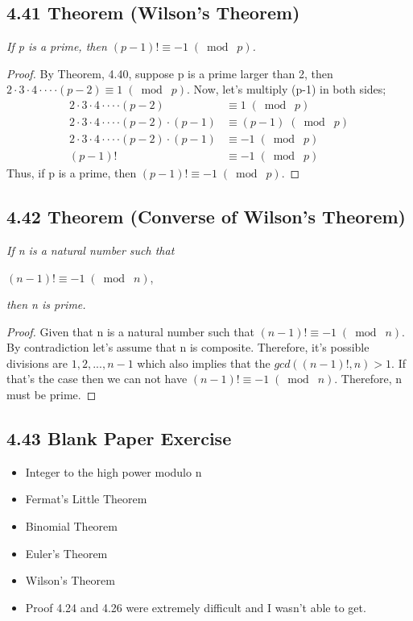 \documentclass{article}
\begin{document}
\subsection*{4.41 Theorem (Wilson's Theorem)} 
\quad \textit{If p is a prime, then $(p-1)! \equiv -1 \;(\bmod\; p)$.}

\begin{proof}
By Theorem, 4.40, suppose p is a prime larger than 2, then $2 \cdot 3 \cdot 4 \cdot\cdot\cdot\cdot(p-2) \equiv 1 \;(\bmod\; p)$. Now, let's multiply (p-1) in both sides;
\begin{align*}
    &&2 \cdot 3 \cdot 4 \cdot\cdot\cdot\cdot(p-2) &\equiv 1 \;(\bmod\; p) &&\\
    &&2 \cdot 3 \cdot 4 \cdot\cdot\cdot\cdot(p-2)\cdot (p-1) &\equiv (p-1) \;(\bmod\; p) &&\\
    &&2 \cdot 3 \cdot 4 \cdot\cdot\cdot\cdot(p-2)\cdot (p-1) &\equiv -1 \;(\bmod\; p) &&\\
    &&(p-1)! &\equiv -1 \;(\bmod\; p) &&
\end{align*}
Thus, if p is a prime, then $(p-1)! \equiv -1 \;(\bmod\; p)$.
\end{proof}

\subsection*{4.42 Theorem (Converse of Wilson's Theorem)} 
\quad \textit{If n is a natural number such that}
\begin{center}
    $(n-1)! \equiv -1 \;(\bmod\; n)$,
\end{center}
\textit{then n is prime.}

\begin{proof}
Given that n is a natural number such that $(n-1)! \equiv -1 \;(\bmod\; n)$. By contradiction let's assume that n is composite. Therefore, it's possible divisions are $1,2,...,n-1$ which also implies that the $gcd((n-1)!, n) > 1$. If that's the case then we can not have $(n-1)! \equiv -1 \;(\bmod\; n)$. Therefore, n must be prime.
\end{proof}

\subsection*{4.43 Blank Paper Exercise} 
\begin{itemize}
    \item Integer to the high power modulo n 
    \item Fermat's Little Theorem
    \item Binomial Theorem
    \item Euler's Theorem
    \item Wilson's Theorem
    \item Proof 4.24 and 4.26 were extremely difficult and I wasn't able to get.
\end{itemize}
\end{document}
